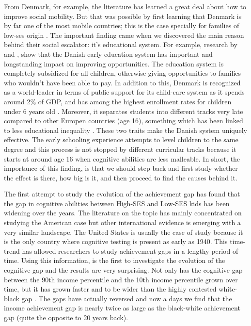 \documentclass[11pt, a4paper]{article}\usepackage[]{graphicx}\usepackage[]{color}
\begin{document}
From Denmark, for example, the literature has learned a great deal about how to improve social mobility. But that was possible by first learning that Denmark is by far one of the most mobile countries; this is the case specially for families of low-ses origin \citep{bjorklund2009, jaeger2007}. The important finding came when we discovered the main reason behind their social escalator: it's educational system. For example, research by \citet{esping_waldfogel2012} and \citet{bauchmuller2014}, show that the Danish early education system has important and longstanding impact on improving opportunities. The education system is completely subsidized for all children, otherwise giving opportunities to families who wouldn't have been able to pay. In addition to this, Denmark is recognized as a world-leader in terms of public support for its child-care system as it spends around 2\% of GDP, and has among the highest enrollment rates for children under 6 years old \citep{esping_waldfogel2012}. Moreover, it separates students into different tracks very late compared to other Europen countries (age 16), something which has been linked to less educational inequality \citep{hanushek_woesmann_tracking}. These two traits make the Danish system uniquely effective. The early schooling experience attempts to level children to the same degree and this process is not stopped by different curricular tracks because it starts at around age 16 when cognitive abilities are less malleable. In short, the importance of this finding, is that we should step back and first study whether the effect is there, how big is it, and then proceed to find the causes behind it.

The first attempt to study the evolution of the achievement gap has found that the gap in cognitive abilities between High-SES and Low-SES kids has been widening over the years. The literature on the topic has mainly concentrated on studying the American case \citep{reardon2011} but other international evidence is emerging with a very similar landscape. The United States is usually the case of study because it is the only country where cognitive testing is present as early as 1940. This time-trend has allowed researchers to study achievement gaps in a lengthy period of time. Using this information, \citet{reardon2011} is the first to investigate the evolution of the cognitive gap and the results are very surprising. Not only has the cognitive gap between the 90th income percentile and the 10th income percentile grown over time, but it has grown faster and to be wider than the highly contested white-black gap \citep{magnuson2008}. The gaps have actually reversed and now a days we find that the income achievement gap is nearly twice as large as the black-white achievement gap (quite the opposite to 20 years back).
\end{document}
